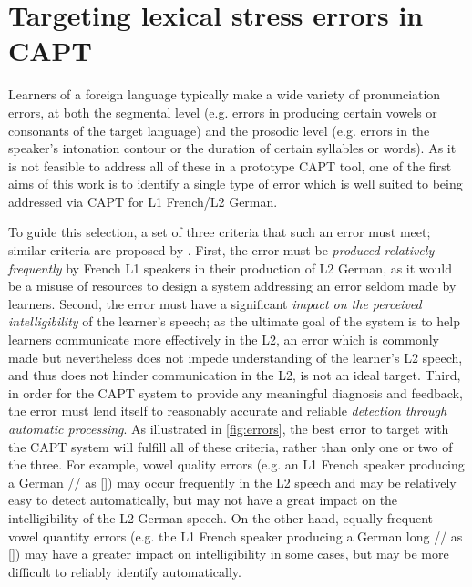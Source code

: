 		
		
 \section{Targeting lexical stress errors in CAPT}
 \label{sec:bkgd:targeting}
 	Learners of a foreign language typically make a wide variety of pronunciation errors, at both the segmental level (e.g. errors in producing certain vowels or consonants of the target language) and the prosodic level (e.g. errors in the speaker's intonation contour or the duration of certain syllables or words). 
 As it is not feasible to address all of these in a prototype CAPT tool, 
one of the first aims of this work is to identify a single type of error which is well suited to being addressed via CAPT for L1 French/L2 German.
	
	To guide this selection,  
a set of three criteria that such an error must meet; similar criteria are proposed by \textcite{Neri2002,Cucchiarini2009}.
%
First, 
the error must be \textit{produced relatively frequently} by French L1 speakers in their production of L2 German, as it would be a misuse of resources to design a system addressing an error seldom made by learners. %
Second,
the error must have a significant \textit{impact on the perceived intelligibility} of the learner's speech; 
as the ultimate goal of the system is to help learners communicate more effectively in the L2,
 an error which is commonly made but nevertheless does not impede understanding of the learner's L2 speech, and thus does not hinder communication in the L2, is not an ideal target. 
Third,
in order for the CAPT system to provide any meaningful diagnosis and feedback, the error must lend itself to reasonably accurate and reliable  \textit{detection through automatic processing}. 
%
%
%
As illustrated in \cref{fig:errors}, the best error to target with the CAPT system will fulfill all of these criteria, rather than only one or two of the three. 
	 For example, vowel quality errors (e.g. an L1 French speaker producing a German // as [\textipa{\oe}]) may occur frequently in the L2 speech and may be relatively easy to detect automatically, but may not have a great impact on the intelligibility of the L2 German speech. On the other hand, equally frequent vowel quantity errors (e.g. the L1 French speaker producing a German long // as []) may have a greater impact on intelligibility in some cases, but may be more difficult to reliably identify automatically.

